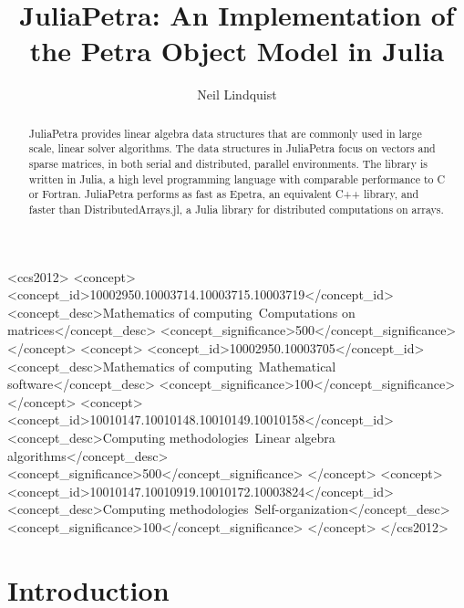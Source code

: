 \documentclass[acmsmall]{acmart}
\title{JuliaPetra: An Implementation of the Petra Object Model in Julia}
\author{Neil Lindquist}
\begin{document}
	
	\begin{CCSXML}
		<ccs2012>
		<concept>
		<concept_id>10002950.10003714.10003715.10003719</concept_id>
		<concept_desc>Mathematics of computing~Computations on matrices</concept_desc>
		<concept_significance>500</concept_significance>
		</concept>
		<concept>
		<concept_id>10002950.10003705</concept_id>
		<concept_desc>Mathematics of computing~Mathematical software</concept_desc>
		<concept_significance>100</concept_significance>
		</concept>
		<concept>
		<concept_id>10010147.10010148.10010149.10010158</concept_id>
		<concept_desc>Computing methodologies~Linear algebra algorithms</concept_desc>
		<concept_significance>500</concept_significance>
		</concept>
		<concept>
		<concept_id>10010147.10010919.10010172.10003824</concept_id>
		<concept_desc>Computing methodologies~Self-organization</concept_desc>
		<concept_significance>100</concept_significance>
		</concept>
		</ccs2012>
	\end{CCSXML}
	
	
	\begin{abstract}
		JuliaPetra provides linear algebra data structures that are commonly used in large scale, linear solver algorithms.
		The data structures in JuliaPetra focus on vectors and sparse matrices, in both serial and
		distributed, parallel environments.
		The library is written in Julia, a high level programming language with comparable performance to C or Fortran.
		JuliaPetra performs as fast as Epetra, an equivalent C++ library, and faster than DistributedArrays.jl, a Julia
		library for distributed computations on arrays.
	\end{abstract}
	
	\maketitle
	
	\section{Introduction}
	
\end{document}
